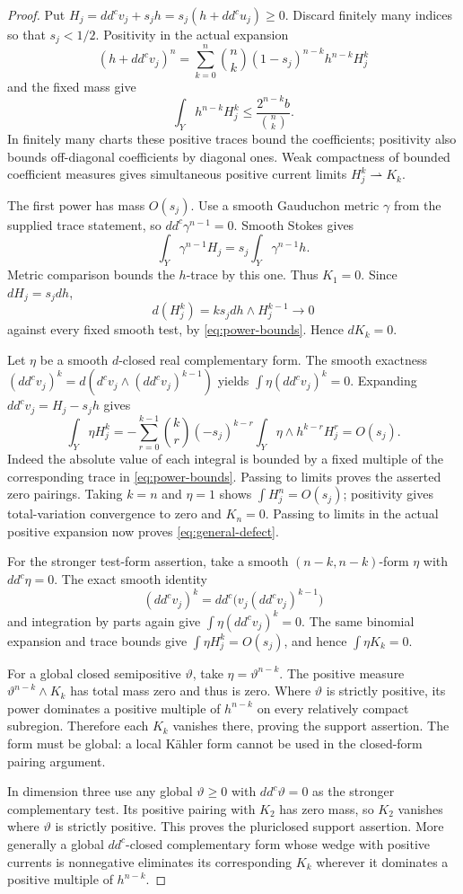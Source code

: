 \documentclass[11pt]{article}
\newcommand{\ddc}{dd^c}
\begin{document}
\begin{proof}
Put $H_j=\ddc v_j+s_jh=s_j(h+\ddc u_j)\geq0$.
Discard finitely many indices so that $s_j<1/2$. Positivity in the
actual expansion
\[
 (h+\ddc v_j)^n=\sum_{k=0}^n\binom nk
                  (1-s_j)^{n-k}h^{n-k}H_j^k
\]
and the fixed mass give
\[
 \int_Yh^{n-k}H_j^k\leq\frac{2^{n-k}b}{\binom nk}.
 \tag{7}\label{eq:power-bounds}
\]
In finitely many charts these positive traces bound the coefficients;
positivity also bounds off-diagonal coefficients by diagonal ones.
Weak compactness of bounded coefficient measures gives simultaneous
positive current limits $H_j^k\rightharpoonup K_k$.

The first power has mass $O(s_j)$. Use a smooth Gauduchon metric
$\gamma$ from the supplied trace statement, so
$\ddc\gamma^{n-1}=0$. Smooth Stokes gives
\[
 \int_Y\gamma^{n-1}H_j=s_j\int_Y\gamma^{n-1}h.
\]
Metric comparison bounds the $h$-trace by this one. Thus $K_1=0$.
Since $dH_j=s_jdh$,
\[
 d(H_j^k)=ks_jdh\wedge H_j^{k-1}\longrightarrow0
\]
against every fixed smooth test, by \eqref{eq:power-bounds}.
Hence $dK_k=0$.

Let $\eta$ be a smooth $d$-closed real complementary form.
The smooth exactness
$(\ddc v_j)^k=d(d^cv_j\wedge(\ddc v_j)^{k-1})$ yields
$\int\eta(\ddc v_j)^k=0$. Expanding $\ddc v_j=H_j-s_jh$ gives
\[
 \int_Y\eta H_j^k
 =-\sum_{r=0}^{k-1}\binom kr(-s_j)^{k-r}
                 \int_Y\eta\wedge h^{k-r}H_j^r=O(s_j).
\]
Indeed the absolute value of each integral is bounded by a fixed
multiple of the corresponding trace in \eqref{eq:power-bounds}.
Passing to limits proves the asserted zero pairings. Taking $k=n$
and $\eta=1$ shows $\int H_j^n=O(s_j)$; positivity gives total-variation
convergence to zero and $K_n=0$. Passing to limits in the actual
positive expansion now proves \eqref{eq:general-defect}.

For the stronger test-form assertion, take a smooth $(n-k,n-k)$-form
$\eta$ with $\ddc\eta=0$. The exact smooth identity
\[
 (\ddc v_j)^k=\ddc\bigl(v_j(\ddc v_j)^{k-1}\bigr)
\]
and integration by parts again give $\int\eta(\ddc v_j)^k=0$.
The same binomial expansion and trace bounds give
$\int\eta H_j^k=O(s_j)$, and hence $\int\eta K_k=0$.

For a global closed semipositive $\vartheta$, take
$\eta=\vartheta^{n-k}$. The positive measure
$\vartheta^{n-k}\wedge K_k$ has total mass zero and thus is zero.
Where $\vartheta$ is strictly positive, its power dominates a positive
multiple of $h^{n-k}$ on every relatively compact subregion. Therefore
each $K_k$ vanishes there, proving the support assertion.
The form must be global: a local K\"ahler form cannot be used in
the closed-form pairing argument.

In dimension three use any global $\vartheta\geq0$ with
$\ddc\vartheta=0$ as the stronger complementary test. Its positive
pairing with $K_2$ has zero mass, so $K_2$ vanishes where
$\vartheta$ is strictly positive. This proves the pluriclosed
support assertion. More generally a global $dd^c$-closed complementary
form whose wedge with positive currents is nonnegative eliminates
its corresponding $K_k$ wherever it dominates a positive multiple
of $h^{n-k}$.
\end{proof}
\end{document}
